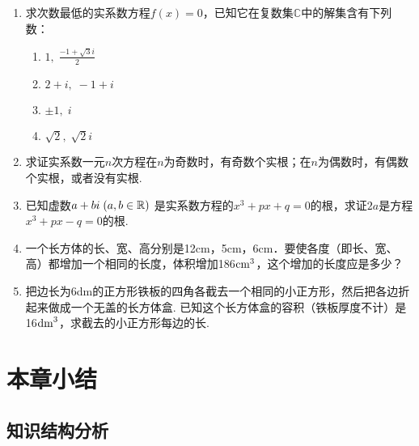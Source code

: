 \begin{enumerate}
\item 求次数最低的实系数方程$f(x)=0$，已知它在复数集$\mathbb{C}$中的解集含有下列数：
\begin{multicols}{2}
\begin{enumerate}[(1)]
    \item $1,\; \frac{-1+\sqrt{3}i}{2}$
    \item $2+i,\; -1+i$
    \item $\pm 1,\; i$
    \item $\sqrt{2},\; \sqrt{2}i$
\end{enumerate}
\end{multicols}

\item 求证实系数一元$n$次方程在$n$为奇数时，有奇数个实根；在$n$为偶数时，有偶数个实根，或者没有实根.
\item 已知虚数$a+bi\; (a,b\in\mathbb{R})$ 是实系数方程的$x^3+px+q=0$的根，求证$2a$是方程$x^3+px-q=0$的根.
\item 一个长方体的长、宽、高分别是12cm，5cm，6cm．要使各度（即长、宽、高）都增加一个相同的长度，体积增加186${\rm cm}^3$，这个增加的长度应是多少？
\item 把边长为6dm的正方形铁板的四角各截去一个相同的小正方形，然后把各边折起来做成一个无盖的长方体盒. 已知这个长方体盒的容积（铁板厚度不计）是16${\rm dm}^3$，求截去的小正方形每边的长.
\end{enumerate}

\section{本章小结}

\subsection*{知识结构分析}

